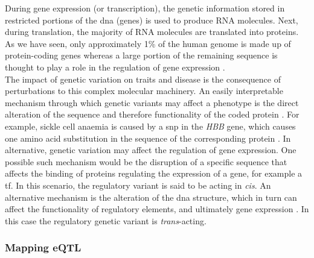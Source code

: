 During gene expression (or transcription), the genetic information stored in restricted portions of the \gls{dna} (genes) is used to produce RNA molecules. 
Next, during translation, the majority of RNA molecules are translated into  proteins. 
As we have seen, only approximately 1\% of the human genome is made up of protein-coding genes \cite{lander2001initial} whereas a large portion of the remaining sequence is thought to play a role in the regulation of gene expression \cite{encode2004encode}. \\

The impact of genetic variation on traits and disease is the consequence of perturbations to this complex molecular machinery.
An easily interpretable mechanism through which genetic variants may affect a phenotype is the direct alteration of the sequence and therefore functionality of the coded protein \cite{westra2014genome}. 
For example, sickle cell anaemia is caused by a \gls{snp} in the \textit{HBB} gene, which causes one amino acid substitution in the sequence of the corresponding protein \cite{laird2010fundamentals}. 
In alternative, genetic variation may affect the regulation of gene expression. 
One possible such mechanism would be the disruption of a specific sequence that affects the binding of proteins regulating the expression of a gene, for example a \gls{tf}. 
In this scenario, the regulatory variant is said to be acting in \textit{cis}.
An alternative mechanism is the alteration of the \gls{dna} structure, which in turn can affect the functionality of regulatory elements, and ultimately gene expression \cite{encode2004encode, kundaje2015integrative}. 
In this case the regulatory genetic variant is \textit{trans}-acting. 

\subsubsection{Mapping eQTL}
\label{sec:eqtl_map}

